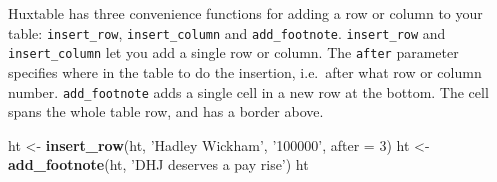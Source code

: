 \documentclass[]{article}
\newenvironment{Shaded}{\begin{snugshade}}{\end{snugshade}}
\newcommand{\DataTypeTok}[1]{\textcolor[rgb]{0.13,0.29,0.53}{#1}}
\newcommand{\DecValTok}[1]{\textcolor[rgb]{0.00,0.00,0.81}{#1}}
\newcommand{\KeywordTok}[1]{\textcolor[rgb]{0.13,0.29,0.53}{\textbf{#1}}}
\newcommand{\NormalTok}[1]{#1}
\newcommand{\StringTok}[1]{\textcolor[rgb]{0.31,0.60,0.02}{#1}}
\begin{document}
Huxtable has three convenience functions for adding a row or column to
your table: \texttt{insert\_row}, \texttt{insert\_column} and
\texttt{add\_footnote}. \texttt{insert\_row} and \texttt{insert\_column}
let you add a single row or column. The \texttt{after} parameter
specifies where in the table to do the insertion, i.e.~after what row or
column number. \texttt{add\_footnote} adds a single cell in a new row at
the bottom. The cell spans the whole table row, and has a border above.

\begin{Shaded}
\begin{Highlighting}[]
\NormalTok{ht <-}\StringTok{ }\KeywordTok{insert_row}\NormalTok{(ht, }\StringTok{'Hadley Wickham'}\NormalTok{, }\StringTok{'100000'}\NormalTok{, }\DataTypeTok{after =} \DecValTok{3}\NormalTok{)}
\NormalTok{ht <-}\StringTok{ }\KeywordTok{add_footnote}\NormalTok{(ht, }\StringTok{'DHJ deserves a pay rise'}\NormalTok{)}
\NormalTok{ht}
\end{Highlighting}
\end{Shaded}
\end{document}
